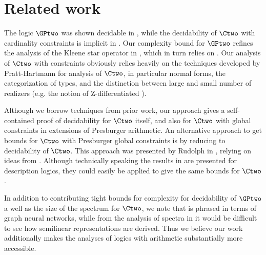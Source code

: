 \section{Related work} \label{sec:related}

The logic $\GPtwo$ was shown decidable in \cite{percentage,twovarpres}, while the decidability
of $\Ctwo$ with cardinality constraints is implicit in \cite{tonyeryk, ultimatelyperiodic}. Our complexity bound for $\GPtwo$ refines the analysis of the Kleene star operator in \cite{usicalp}, which in turn relies on \cite{kleenestar}. Our analysis of $\Ctwo$ with constraints obviously relies heavily on the techniques developed by Pratt-Hartmann for analysis of $\Ctwo$, in particular normal forms, the categorization of types, and the distinction between large and small number of realizers (e.g. the notion of Z-differentiated \cite{ctwocomplexity,gctwocomplexity}).

Although we borrow techniques from prior work, our approach gives a self-contained proof of decidability for $\Ctwo$ itself, and also for $\Ctwo$ with global constraints in extensions of Presburger arithmetic. An alternative approach to get bounds for $\Ctwo$ with Presburger global constraints is by reducing to decidability of $\Ctwo$.
This approach was presented by Rudolph in \cite{rudolphcardinality}, relying on ideas from \cite{baadercardinality}. Although technically speaking the results in \cite{rudolphcardinality} are presented for description logics, they could easily be applied to give the same bounds for $\Ctwo$.

In addition to contributing tight bounds for complexity for decidability of $\GPtwo$ a well as the size of the spectrum  for $\Ctwo$, we note that \cite{usicalp} is phrased in terms of graph neural networks, while from the analysis of spectra in \cite{tonyeryk,ultimatelyperiodic} it would be difficult to see how semilinear representations are derived. Thus we believe our work additionally makes the analyses of logics with arithmetic substantially more accessible.
